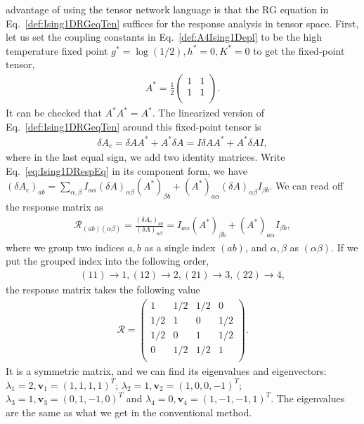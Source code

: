 \documentclass[aps,prb,reprint,superscriptaddress,floatfix]{revtex4-2}
\begin{document}
advantage of using the tensor network language is that the RG equation in
Eq.~\eqref{def:Ising1DRGeqTen} suffices for the response analysis in
tensor space. First, let us set the coupling constants in
Eq.~\eqref{def:A4Ising1Depl} to be the high temperature fixed point
$g^* = \log{\left(1/2\right)}, h^*=0, K^* = 0$ to get the fixed-point
tensor,
%
\begin{align}\label{eq:fixedA4Ising1D}
    A^* = \frac{1}{2}
\begin{pmatrix}
    1 & 1 \\
    1 & 1 \\
\end{pmatrix}.
\end{align}
%
It can be checked that $A^* A^* = A^*$. The linearized version of
Eq.~\eqref{def:Ising1DRGeqTen} around this fixed-point tensor is
%
\begin{align}\label{eq:Ising1DRespEq}
    \delta A_c = \delta A A^* + A^* \delta A = I \delta A A^* + A^*
    \delta A I,
\end{align}
%
where in the last equal sign, we add two identity matrices. Write
Eq.~\eqref{eq:Ising1DRespEq} in its component form, we have
$\left(\delta A_c\right)_{ab} =
\sum_{\alpha,\beta}I_{a\alpha}\left(\delta A\right)_{\alpha\beta}
\left(A^*\right)_{\beta b} + \left(A^*\right)_{a\alpha} \left(\delta
A\right)_{\alpha \beta} I_{\beta b}$. We can read off the response
matrix as
%
\begin{align}\label{eq:Ising1DRespMat}
    \mathcal{R}_{(ab)(\alpha \beta)} = \frac{\left(\delta
    A_c\right)_{ab}}{\left(\delta A\right)_{\alpha \beta}} =
    I_{a\alpha}\left(A^*\right)_{\beta b} + \left(A^*\right)_{a\alpha}
    I_{\beta b},
\end{align}
%
where we group two indices $a,b$ as a single index $(ab)$, and
$\alpha,\beta$ as $(\alpha\beta)$. If we put the grouped index into the
following order,
%
\begin{align}\label{def:orderConvention}
    (11) \rightarrow 1, (12) \rightarrow 2, (21) \rightarrow 3, (22)
    \rightarrow 4,
\end{align}
%
the response matrix takes the following value
%
\begin{align}\label{eq:Ising1DRespMatNum}
    \mathcal{R} = 
\begin{pmatrix}
    1 & 1/2 & 1/2 & 0 \\
    1/2 & 1 & 0 & 1/2 \\
    1/2 & 0 & 1 & 1/2 \\
    0 & 1/2 & 1/2 & 1 \\
\end{pmatrix}.
\end{align}
%
It is a symmetric matrix, and we can find its eigenvalues and
eigenvectors: $\lambda_1 = 2,\mathbf{v}_1 = (1,1,1,1)^T$; $\lambda_2 =
1,\mathbf{v}_2 = (1,0,0,-1)^T$; $\lambda_3 =1, \mathbf{v}_3 =
(0,1,-1,0)^T$ and $\lambda_4 = 0, \mathbf{v}_4 = (1,-1,-1,1)^T$. The
eigenvalues are the same as what we get in the conventional method. 
%
\end{document}

